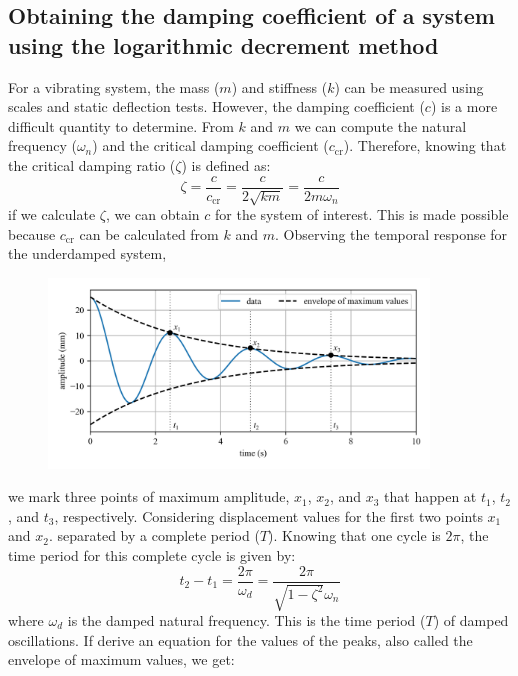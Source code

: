 \documentclass[12pt,a4paper]{article}
\begin{document}
		\subsection*{Obtaining the damping coefficient of a system using the logarithmic decrement method}
		
			For a vibrating system, the  mass ($m$) and stiffness ($k$) can be measured using scales and static deflection tests. However, the damping coefficient ($c$) is a more difficult quantity to determine. From $k$ and $m$ we can compute the natural frequency ($\omega_n$) and the critical damping coefficient ($c_\text{cr}$). Therefore, knowing that the critical damping ratio ($\zeta$) is defined as:
			\begin{equation}
				\zeta = \frac{c}{c_{\text{cr}}} = \frac{c}{2\sqrt{km}} = \frac{c}{2m\omega_n}
			\end{equation}				
			if we calculate $\zeta$, we can obtain $c$ for the system of interest. This is made possible because $c_\text{cr}$ can be calculated from $k$ and $m$. Observing the temporal response for the underdamped system, 
			\begin{figure}[H]
				\centering
				\includegraphics[width=0.9\textwidth]{../../Figures/Logarithmic_decrement.png}
			\end{figure}
			we mark three points of maximum amplitude, $x_1$, $x_2$, and $x_3$ that happen at $t_1$, $t_2$, and $t_3$, respectively. Considering displacement values for the first two points $x_1$ and $x_2$. separated by a complete period ($T$).  Knowing that one cycle is $2 \pi$, the time period for this complete cycle is given by:
			\begin{equation}
				t_2-t_1 = \frac{2\pi}{\omega_d} = \frac{2\pi}{\sqrt{1-\zeta^2}\omega_n}
			\end{equation}				
			where $\omega_d$ is the damped natural frequency. This is the time period ($T$) of damped oscillations. If derive an equation for the values of the peaks, also called the envelope of maximum values, we get: 
\end{document}
